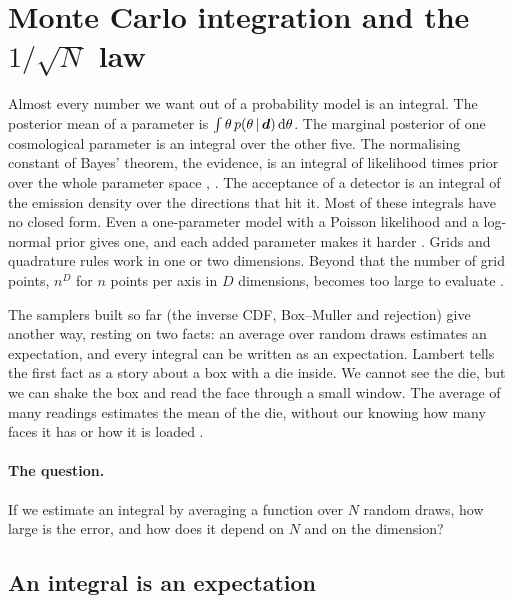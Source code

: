 \section{Monte Carlo integration and the $1/\sqrt N$ law}
\label{6b:sec:mcint}

Almost every number we want out of a probability model is an integral. The
posterior mean of a parameter is $\int\theta\,p(\theta\,\vert\,\bm{d})\,\mathrm{d}\theta$. The
marginal posterior of one cosmological parameter is an integral over the other five.
The normalising constant of Bayes' theorem, the evidence, is an integral of likelihood
times prior over the whole parameter space ,
. The acceptance of a detector is an integral of the emission
density over the directions that hit it. Most of these integrals have no closed form.
Even a one-parameter model with a Poisson likelihood and a log-normal prior gives one,
and each added parameter makes it harder . Grids and
quadrature rules work in one or two dimensions. Beyond that the number of grid
points, $n^D$ for $n$ points per axis in $D$ dimensions, becomes too large to evaluate
.

The samplers built so far (the inverse CDF, Box--Muller and rejection) give another
way, resting on two facts: an average over random draws estimates an expectation, and
every integral can be written as an expectation. Lambert tells the first fact as a
story about a box with a die inside. We cannot see the die, but we can shake the box and
read the face through a small window. The average of many readings estimates the
mean of the die, without our knowing how many faces it has or how it is loaded
.

\paragraph{The question.} If we estimate an integral by averaging a function over $N$
random draws, how large is the error, and how does it depend on $N$ and on the dimension?

\subsection{An integral is an expectation}
\label{6b:sec:int-expect}

